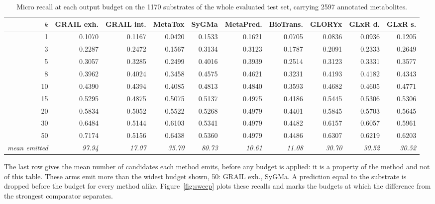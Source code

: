 \begin{table}[t]
\centering
\begin{threeparttable}
\caption{Micro recall at each output budget on the 1170 substrates of the whole evaluated test set, carrying 2597 annotated metabolites.}
\label{tab:sweep}
\scriptsize
\setlength{\tabcolsep}{4.5pt}
\begin{tabular}{rrrrrrrrrr}
\toprule
$k$ & GRAIL exh. & GRAIL int. & MetaTox & SyGMa & MetaPred. & BioTrans. & GLORYx & GLxR d. & GLxR s. \\
\midrule
1 & 0.1070 & 0.1167 & 0.0420 & 0.1533 & 0.1621 & 0.0705 & 0.0836 & 0.0936 & 0.1205 \\
3 & 0.2287 & 0.2472 & 0.1567 & 0.3134 & 0.3123 & 0.1787 & 0.2091 & 0.2333 & 0.2649 \\
5 & 0.3057 & 0.3285 & 0.2499 & 0.4016 & 0.3939 & 0.2514 & 0.3123 & 0.3331 & 0.3577 \\
8 & 0.3962 & 0.4024 & 0.3458 & 0.4575 & 0.4621 & 0.3231 & 0.4193 & 0.4182 & 0.4343 \\
10 & 0.4390 & 0.4394 & 0.4085 & 0.4813 & 0.4840 & 0.3593 & 0.4682 & 0.4605 & 0.4771 \\
15 & 0.5295 & 0.4875 & 0.5075 & 0.5137 & 0.4975 & 0.4186 & 0.5445 & 0.5306 & 0.5306 \\
20 & 0.5834 & 0.5052 & 0.5522 & 0.5268 & 0.4979 & 0.4401 & 0.5845 & 0.5703 & 0.5645 \\
30 & 0.6484 & 0.5144 & 0.6103 & 0.5341 & 0.4979 & 0.4482 & 0.6157 & 0.6057 & 0.5961 \\
50 & 0.7174 & 0.5156 & 0.6438 & 0.5360 & 0.4979 & 0.4486 & 0.6307 & 0.6219 & 0.6203 \\
\midrule
\emph{mean emitted} & \emph{97.94} & \emph{17.07} & \emph{35.70} & \emph{80.73} & \emph{10.61} & \emph{11.08} & \emph{30.70} & \emph{30.52} & \emph{30.52} \\
\bottomrule
\end{tabular}
\begin{tablenotes}[flushleft]\footnotesize
\item The last row gives the mean number of candidates each method emits, before any budget is applied: it is a property of the method and not of this table. These arms emit more than the widest budget shown, 50: GRAIL exh., SyGMa. A prediction equal to the substrate is dropped before the budget for every method alike. Figure~\ref{fig:sweep} plots these recalls and marks the budgets at which the difference from the strongest comparator separates.
\end{tablenotes}
\end{threeparttable}
\end{table}
